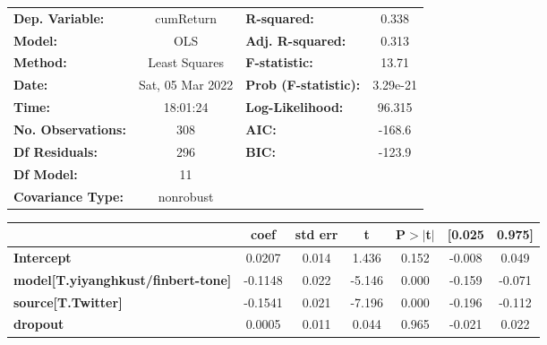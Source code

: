 \begin{center}
\begin{tabular}{lclc}
\toprule
\textbf{Dep. Variable:}                    &    cumReturn     & \textbf{  R-squared:         } &     0.338   \\
\textbf{Model:}                            &       OLS        & \textbf{  Adj. R-squared:    } &     0.313   \\
\textbf{Method:}                           &  Least Squares   & \textbf{  F-statistic:       } &     13.71   \\
\textbf{Date:}                             & Sat, 05 Mar 2022 & \textbf{  Prob (F-statistic):} &  3.29e-21   \\
\textbf{Time:}                             &     18:01:24     & \textbf{  Log-Likelihood:    } &    96.315   \\
\textbf{No. Observations:}                 &         308      & \textbf{  AIC:               } &    -168.6   \\
\textbf{Df Residuals:}                     &         296      & \textbf{  BIC:               } &    -123.9   \\
\textbf{Df Model:}                         &          11      & \textbf{                     } &             \\
\textbf{Covariance Type:}                  &    nonrobust     & \textbf{                     } &             \\
\bottomrule
\end{tabular}
\begin{tabular}{lcccccc}
                                           & \textbf{coef} & \textbf{std err} & \textbf{t} & \textbf{P$> |$t$|$} & \textbf{[0.025} & \textbf{0.975]}  \\
\midrule
\textbf{Intercept}                         &       0.0207  &        0.014     &     1.436  &         0.152        &       -0.008    &        0.049     \\
\textbf{model[T.yiyanghkust/finbert-tone]} &      -0.1148  &        0.022     &    -5.146  &         0.000        &       -0.159    &       -0.071     \\
\textbf{source[T.Twitter]}                 &      -0.1541  &        0.021     &    -7.196  &         0.000        &       -0.196    &       -0.112     \\
\textbf{dropout}                           &       0.0005  &        0.011     &     0.044  &         0.965        &       -0.021    &        0.022     \\

\end{tabular}
\end{center}
